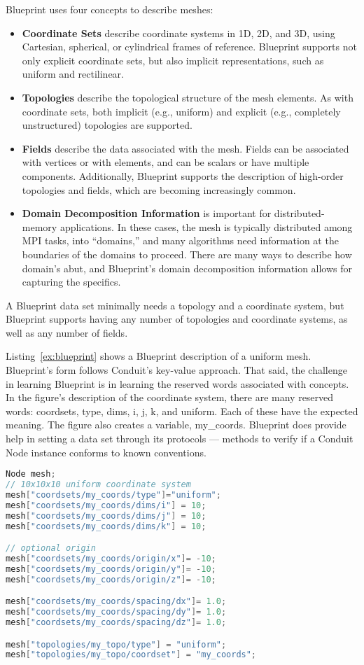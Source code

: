 Blueprint uses four concepts to describe meshes:
\begin{itemize}
  \item \textbf{Coordinate Sets} describe coordinate systems in 1D, 2D, and 3D, 
using Cartesian, spherical, or cylindrical frames of reference.
%
Blueprint supports not only explicit coordinate sets, but also implicit representations,
such as uniform and rectilinear.
  \item \textbf{Topologies} describe the topological structure of the mesh elements.
%
As with coordinate sets, both implicit (e.g., uniform) and explicit
(e.g., completely unstructured) topologies are supported.
  \item \textbf{Fields} describe the data associated with the mesh.
Fields can be associated with vertices or with elements, and 
can be scalars or have multiple components.
%
Additionally, Blueprint supports the description of high-order
topologies and fields, which are becoming increasingly common.
  \item \textbf{Domain Decomposition Information} is important for distributed-memory applications.
%
In these cases, the mesh is typically distributed among MPI tasks, into ``domains,'' and
many algorithms need information at the boundaries of the domains to proceed.
%
There are many ways to describe how domain's abut, and Blueprint's domain decomposition information 
allows for capturing the specifics.
\end{itemize}
A Blueprint data set minimally needs a topology and a coordinate system,
but Blueprint supports having any number of topologies and coordinate
systems, as well as any number of fields.
%


Listing~\ref{ex:blueprint} shows a Blueprint description of a uniform mesh.
%
Blueprint's form follows Conduit's key-value approach.
%
That said, the challenge in learning Blueprint is in learning the reserved words associated
with concepts.  
%
In the figure's description of the coordinate system, there are many reserved words:
coordsets, type, dims,  i, j, k, and uniform.
%
Each of these have the expected meaning.
%
The figure also creates a variable, my\_coords.
%
Blueprint does provide help in setting a data set through its protocols ---
methods to verify if a Conduit Node instance conforms to known conventions. 


\begin{lstlisting}[language=C++,caption={\label{ex:blueprint}An example of a specifying a $10^3$ uniform grid in Blueprint.}]
Node mesh;
// 10x10x10 uniform coordinate system
mesh["coordsets/my_coords/type"]="uniform";
mesh["coordsets/my_coords/dims/i"] = 10;
mesh["coordsets/my_coords/dims/j"] = 10;
mesh["coordsets/my_coords/dims/k"] = 10;

// optional origin
mesh["coordsets/my_coords/origin/x"]= -10;
mesh["coordsets/my_coords/origin/y"]= -10;
mesh["coordsets/my_coords/origin/z"]= -10;

mesh["coordsets/my_coords/spacing/dx"]= 1.0;
mesh["coordsets/my_coords/spacing/dy"]= 1.0;
mesh["coordsets/my_coords/spacing/dz"]= 1.0;

mesh["topologies/my_topo/type"] = "uniform";
mesh["topologies/my_topo/coordset"] = "my_coords";
\end{lstlisting}

